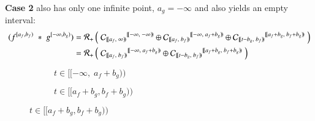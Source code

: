 \textbf{Case 2} also has only one infinite point, $a_g=-\infty$ and also yields an empty interval:
\begin{align*}
	(f^{[a_f,b_f)} \;*\; g^{[-\infty,b_g)}) 
	= \R[+] &\left( \; 
			{\C[ [\![a_f,\;\infty)\!) ]}^{[\![-\infty,\; -\infty)\!)} \oplus
			{\C[ [\![a_f,\;b_f)\!) ]}^{[\![-\infty,\; a_f+b_g)\!)} \oplus
			{\C[ [\![t-b_g,\;b_f)\!) ]}^{[\![a_f+b_g,\; b_f+b_g)\!)} 
		\; \right)\\
	= \R[+] &\left( \; 
			{\C[ [\![a_f,\;b_f)\!) ]}^{[\![-\infty,\; a_f+b_g)\!)} \oplus
			{\C[ [\![t-b_g,\;b_f)\!) ]}^{[\![a_f+b_g,\; b_f+b_g)\!)} 
		\; \right)
\end{align*} 
\vspace{-1cm}
\begin{figure}[h]
	\centering
	\begin{subfigure}{0.4\textwidth}
		\caption{$t \in [\![-\infty, \; a_f+b_g)\!)$} 
		\centering
	\end{subfigure}
	\begin{subfigure}{0.4\textwidth}
		\caption{$t \in [\![a_f+b_g, b_f+b_g)\!)$} 
		\centering
	\end{subfigure}
\end{figure}

